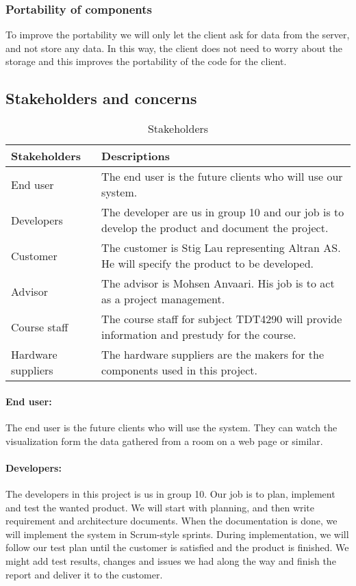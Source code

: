 \documentclass[../document.tex]{subfiles}
\begin{document}
\subsubsection{Portability of components}
To improve the portability we will only let the client ask for data from the server, and not store any data. In this way, the client does not need to worry about the storage and this improves the portability of the code for the client.

\subsection{Stakeholders and concerns}
\begin{table}[H]
\caption{Stakeholders}
\begin{tabularx}{\textwidth}{|X|X|}
\hline
\textbf{Stakeholders}
&
\textbf{Descriptions}
\\ \hline
End user
&
The end user is the future clients who will use our system.
\\ \hline
Developers
&
The developer are us in group 10 and our job is to develop the product and document the project.
\\ \hline
Customer
&
The customer is Stig Lau representing Altran AS. He will specify the product to be developed.
\\ \hline
Advisor
&
The advisor is Mohsen Anvaari. His job is to act as a project management.
\\ \hline
Course staff
&
The course staff for subject TDT4290 will provide information and prestudy for the course.
\\ \hline
Hardware suppliers
&
The hardware suppliers are the makers for the components used in this project. 
\\ \hline
\end{tabularx}
\end{table}

\paragraph{End user:} The end user is the future clients who will use the system. They can watch the visualization form the data gathered from a room on a web page or similar. 

\paragraph{Developers:} The developers in this project is us in group 10. Our job is to plan, implement and test the wanted product. We will start with planning, and then write requirement and architecture documents. When the documentation is done, we will implement the system in Scrum-style sprints. During implementation, we will follow our test plan until the customer is satisfied and the product is finished. We might add test results, changes and issues we had along the way and finish the report and deliver it to the customer.
\end{document}
